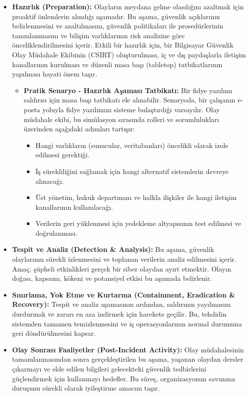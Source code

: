 \begin{itemize}
    \item \textbf{Hazırlık (Preparation):} Olayların meydana gelme olasılığını azaltmak için proaktif önlemlerin alındığı aşamadır. Bu aşama, güvenlik açıklarının belirlenmesini ve azaltılmasını, güvenlik politikaları ile prosedürlerinin tanımlanmasını ve bilişim varlıklarının risk analizine göre önceliklendirilmesini içerir. Etkili bir hazırlık için, bir Bilgisayar Güvenlik Olay Müdahale Ekibinin (CSIRT) oluşturulması, iç ve dış paydaşlarla iletişim kanallarının kurulması ve düzenli masa başı (tabletop) tatbikatlarının yapılması hayati önem taşır.

    \begin{itemize}
        \item \textbf{Pratik Senaryo - Hazırlık Aşaması Tatbikatı:}
        Bir fidye yazılımı saldırısı için masa başı tatbikatı ele alınabilir. Senaryoda, bir çalışanın e-posta yoluyla fidye yazılımını sisteme bulaştırdığı varsayılır. Olay müdahale ekibi, bu simülasyon sırasında rolleri ve sorumlulukları üzerinden aşağıdaki adımları tartışır:
        \begin{itemize}
            \item Hangi varlıkların (sunucular, veritabanları) öncelikli olarak izole edilmesi gerektiği.
            \item İş sürekliliğini sağlamak için hangi alternatif sistemlerin devreye alınacağı.
            \item Üst yönetim, hukuk departmanı ve halkla ilişkiler ile hangi iletişim kanallarının kullanılacağı.
            \item Verilerin geri yüklenmesi için yedekleme altyapısının test edilmesi ve doğrulanması.
        \end{itemize}
    \end{itemize}
    \item \textbf{Tespit ve Analiz (Detection \& Analysis):} Bu aşama, güvenlik olaylarının sürekli izlenmesini ve toplanan verilerin analiz edilmesini içerir. Amaç, şüpheli etkinlikleri gerçek bir siber olaydan ayırt etmektir. Olayın doğası, kapsamı, kökeni ve potansiyel etkisi bu aşamada belirlenir.

    \item \textbf{Sınırlama, Yok Etme ve Kurtarma (Containment, Eradication \& Recovery):} Tespit ve analiz aşamasının ardından, saldırının yayılmasını durdurmak ve zararı en aza indirmek için harekete geçilir. Bu, tehdidin sistemden tamamen temizlenmesini ve iş operasyonlarının normal durumuna geri döndürülmesini kapsar.

    \item \textbf{Olay Sonrası Faaliyetler (Post-Incident Activity):} Olay müdahalesinin tamamlanmasından sonra gerçekleştirilen bu aşama, yaşanan olaydan dersler çıkarmayı ve elde edilen bilgileri gelecekteki güvenlik tedbirlerini güçlendirmek için kullanmayı hedefler. Bu süreç, organizasyonun savunma duruşunu sürekli olarak iyileştirme amacını taşır.
\end{itemize}

